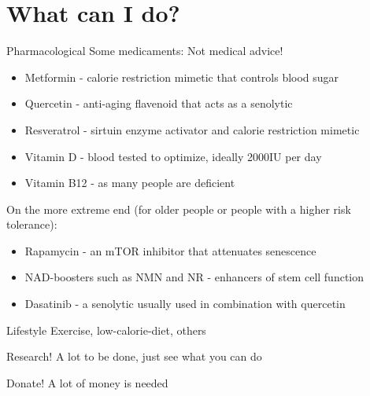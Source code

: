 \section{What can I do?}



\begin{frame}[c]{Pharmacological}
    Some medicaments: Not medical advice!

    \begin{itemize}[<+(1)->]
        \item Metformin - calorie restriction mimetic that controls blood sugar
        \item Quercetin - anti-aging flavenoid that acts as a senolytic
        \item Resveratrol - sirtuin enzyme activator and calorie restriction mimetic
        \item Vitamin D - blood tested to optimize, ideally 2000IU per day
        \item Vitamin B12 - as many people are deficient
    \end{itemize}


    On the more extreme end (for older people or people with a higher risk tolerance):

    \begin{itemize}[<+(1)->]
        \item Rapamycin - an mTOR inhibitor that attenuates senescence
        \item NAD-boosters such as NMN and NR - enhancers of stem cell function
        \item Dasatinib - a senolytic usually used in combination with quercetin
    \end{itemize}

\end{frame}


\begin{frame}[c]{Lifestyle}
    Exercise, low-calorie-diet, others
\end{frame}


\begin{frame}[c]{Research!}
    A lot to be done, just see what you can do
\end{frame}


\begin{frame}[c]{Donate!}
    A lot of money is needed
\end{frame}
